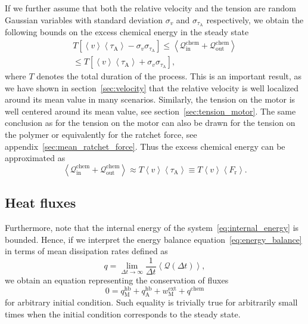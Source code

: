 \documentclass[aps,pre,twocolumn,showpacs,showkeys,superscriptaddress,floatfix]{revtex4-1}
\begin{document}
If we further assume that both the relative velocity and the tension are random Gaussian variables with standard deviation $\sigma_v$ and $\sigma_{\tau_\text{A}}$ respectively, 
we obtain the following bounds on the excess chemical energy in the steady state 
\begin{multline*}
T \left[ \left\langle v \right\rangle \left\langle \tau_\text{A} \right\rangle - \sigma_v \sigma_{\tau_\text{A}} \right]
\le 
\left\langle 
{\mathcal Q}_\text{in}^\text{chem} + {\mathcal Q}_\text{out}^\text{chem} 
\right\rangle 
\\
\le T \left[ \left\langle v \right\rangle \left\langle \tau_\text{A} \right\rangle + \sigma_v \sigma_{\tau_\text{A}} \right] ,
\end{multline*}
where $T$ denotes the total duration of the process. 
This is an important result, as we have shown in section~\ref{sec:velocity} 
that the relative velocity is well localized around its mean value in many scenarios. 
Similarly, the tension on the motor is well centered around its mean value, see section~\ref{sec:tension_motor}.
The same conclusion as for the tension on the motor can also be drawn  for the tension on the polymer or equivalently for the ratchet force, see appendix~\ref{sec:mean_ratchet_force}. 
Thus the excess chemical energy can be approximated as 
\[
\left\langle 
{\mathcal Q}_\text{in}^\text{chem} + {\mathcal Q}_\text{out}^\text{chem} 
\right\rangle 
\approx T \left\langle v \right\rangle \left\langle \tau_\text{A} \right\rangle 
\equiv T \left\langle v \right\rangle \left\langle F_\text{r} \right\rangle .
\]


\subsection{Heat fluxes}
Furthermore, note that the internal energy of the system~\eqref{eq:internal_energy} is bounded.
Hence, if we interpret the energy balance equation~\eqref{eq:energy_balance} in terms of mean dissipation rates defined as 
\begin{equation}
q = \lim_{\Delta t \to \infty} \frac{1}{\Delta t} \left\langle {\mathcal Q}(\Delta t) \right\rangle ,
\label{eq:heat_flux}
\end{equation}
we obtain an equation representing the conservation of fluxes 
\begin{equation}
0 = q_\text{M}^\text{hb} + q_\text{A}^\text{hb} + w^\text{ext}_\text{M} + q^\text{chem} 
\label{eq:heat_flux_balance}
\end{equation}
for arbitrary initial condition. 
Such equality is trivially true for arbitrarily small times when the initial condition corresponds to the steady state.
\end{document}
